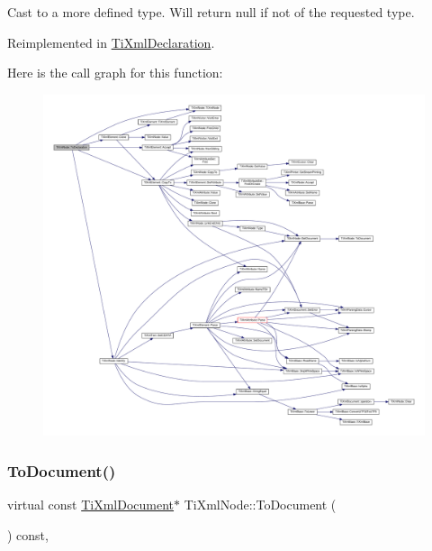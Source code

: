 Cast to a more defined type. Will return null if not of the requested type. 



Reimplemented in \hyperlink{class_ti_xml_declaration_a6bd3d1daddcaeb9543c24bfd090969ce}{Ti\+Xml\+Declaration}.

Here is the call graph for this function\+:
\nopagebreak
\begin{figure}[H]
\begin{center}
\leavevmode
\includegraphics[width=350pt]{class_ti_xml_node_a4027136ca820ff4a636b607231b6a6df_cgraph}
\end{center}
\end{figure}
\mbox{\label{class_ti_xml_node_a775a904618cad6e4a8049bda4f5a6aa9}} 
\subsubsection{\texorpdfstring{To\+Document()}{ToDocument()}\hspace{0.1cm}{\footnotesize\ttfamily [1/2]}}
{\footnotesize\ttfamily virtual const \hyperlink{class_ti_xml_document}{Ti\+Xml\+Document}$\ast$ Ti\+Xml\+Node\+::\+To\+Document (\begin{DoxyParamCaption}{ }\end{DoxyParamCaption}) const\hspace{0.3cm}{\ttfamily [inline]}, {\ttfamily [virtual]}}



